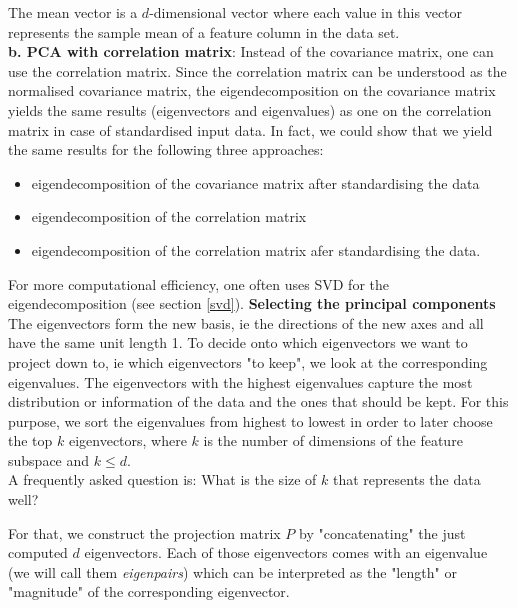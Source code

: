 \documentclass[journal, a4paper]{IEEEtran}
\begin{document}
The mean vector is a \(d\)-dimensional vector where each value in this vector represents the sample mean of a feature column in the data set.\\
\textbf{b. PCA with correlation matrix}: 
Instead of the covariance matrix, one can use the correlation matrix. 
Since the correlation matrix can be understood as the normalised covariance matrix, the eigendecomposition on the covariance matrix yields the same results (eigenvectors and eigenvalues) as one on the correlation matrix in case of standardised input data. 
In fact, we could show that we yield the same results for the following three approaches:
\begin{itemize}
\item eigendecomposition of the covariance matrix after standardising the data
\item eigendecomposition of the correlation matrix
\item eigendecomposition of the correlation matrix afer standardising the data.
\end{itemize}
For more computational efficiency, one often uses SVD for the eigendecomposition (see section \ref{svd}).
\newline
%
\textbf{Selecting the principal components}\\
The eigenvectors form the new basis, ie the directions of the new axes and all have the same unit length 1. To decide onto which eigenvectors we want to project down to, ie which eigenvectors "to keep", we look at the corresponding eigenvalues. The eigenvectors with the highest eigenvalues capture the most distribution or information of the data and the ones that should be kept. 
For this purpose, we sort the eigenvalues from highest to lowest in order to later choose the top \( k \) eigenvectors, where \( k \) is the number of dimensions of the feature subspace and \( k \leq d \). \\
A frequently asked question is: What is the size of \( k \) that represents the data well?


For that, we construct the projection matrix \( P \) by "concatenating" the just computed \( d \) eigenvectors. Each of those eigenvectors comes with an eigenvalue (we will call them \textit{eigenpairs}) which can be interpreted as the "length" or "magnitude" of the corresponding eigenvector. 
\end{document}

